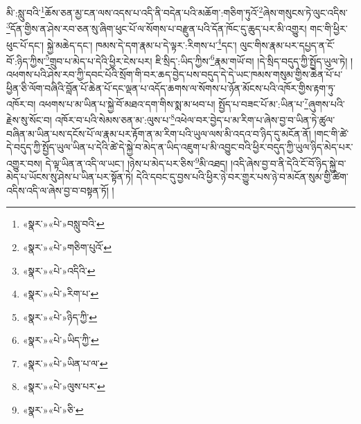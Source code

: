 མི་:སླུ་བའི་\footnote{«སྣར་»«པེ་»བསླུ་བའི་}ཆོས་ཅན་མྱ་ངན་ལས་འདས་པ་འདི་ནི་བདེན་པའི་མཆོག་:གཅིག་ཏུའོ་\footnote{«སྣར་»«པེ་»གཅིག་པུའོ་}ཞེས་གསུངས་ཏེ་ལུང་འདིས་\footnote{«སྣར་»«པེ་»འདིའི་}དོན་གྱིས་ན་ཤེས་རབ་ཅན་སུ་ཞིག་ཕུང་པོ་ལ་སོགས་པ་བརྫུན་པའི་དོན་ཁོང་དུ་ཆུད་པར་མི་འགྱུར། གང་གི་ཕྱིར་ཕུང་པོ་དང་། སྐྱེ་མཆེད་དང་། ཁམས་དེ་དག་རྣམ་པ་དེ་ལྟར་:རིགས་པ་\footnote{«སྣར་»«པེ་»རིག་པ་}དང་། ལུང་གིས་རྣམ་པར་དཔྱད་ན་ངོ་བོ་:ཉིད་ཀྱིས་\footnote{«སྣར་»«པེ་»ཉིད་ཀྱི་}གྲུབ་པ་མེད་པ་དེའི་ཕྱིར་ངེས་པར། ཇི་སྲིད་:ཡིད་ཀྱིས་\footnote{«སྣར་»«པེ་»ཡིད་ཀྱི་}རྣམ་གཡོ་བ། །དེ་སྲིད་བདུད་ཀྱི་སྤྱོད་ཡུལ་ཏེ། །འཕགས་པའི་ཤེས་རབ་ཀྱི་དབང་པོའི་སྲོག་གི་བར་ཆད་བྱེད་པས་བདུད་དེ་དེ་ཡང་ཁམས་གསུམ་གྱིས་ཆེན་པོ་པ་ཕྱིན་ཅི་ལོག་བཞིའི་བློན་པོ་ཆེན་པོ་དང་ལྡན་པ་འདོད་ཆགས་ལ་སོགས་པ་ཉོན་མོངས་པའི་འཁོར་གྱིས་རྟག་ཏུ་འཁོར་བ། འཕགས་པ་མ་ཡིན་པ་སྐྱེ་བོ་མཐའ་དག་གིས་སྨ་མ་ཕབ་པ། སྤྱོད་པ་བཟང་པོ་མ་:ཡིན་པ་\footnote{«སྣར་»«པེ་»ཡིན་པ་ལ་}ཞུགས་པའི་རྗེས་སུ་སོང་བ། འཁོར་བ་པའི་སེམས་ཅན་མ་:ལུས་པ་\footnote{«སྣར་»«པེ་»ལུས་པར་}འཕེལ་བར་བྱེད་པ་མ་རིག་པ་ཞེས་བྱ་བ་ཡིན་ཏེ་ཚུལ་བཞིན་མ་ཡིན་པས་དངོས་པོ་ལ་རྣམ་པར་རྟོག་ན་མ་རིག་པའི་ཡུལ་ལས་མི་འདའ་བ་ཉིད་དུ་མངོན་ནོ། །གང་གི་ཚེ་དེ་བདུད་ཀྱི་སྤྱོད་ཡུལ་ཡིན་པ་དེའི་ཚེ་དེ་སྐྱེ་བ་མེད་ན་ཡིད་འཇུག་པ་མི་འབྱུང་བའི་ཕྱིར་བདུད་ཀྱི་ཡུལ་ཉིད་མེད་པར་འགྱུར་བས། དེ་ལྟ་ཡིན་ན་འདི་ལ་ཡང་། །ཉེས་པ་མེད་པར་ཅིས་\footnote{«སྣར་»«པེ་»ཅི་}མི་འཐད། །འདི་ཞེས་བྱ་བ་ནི་དེའི་ངོ་བོ་ཉིད་སྐྱེ་བ་མེད་པ་ཡོངས་སུ་ཤེས་པ་ཡིན་པར་སྟོན་ཏེ། དེའི་དབང་དུ་བྱས་པའི་ཕྱིར་ཉེ་བར་གྱུར་པས་ཉེ་བ་མངོན་སུམ་གྱི་ཚིག་འདིས་འདི་ལ་ཞེས་བྱ་བ་བསྟན་ཏོ། །
